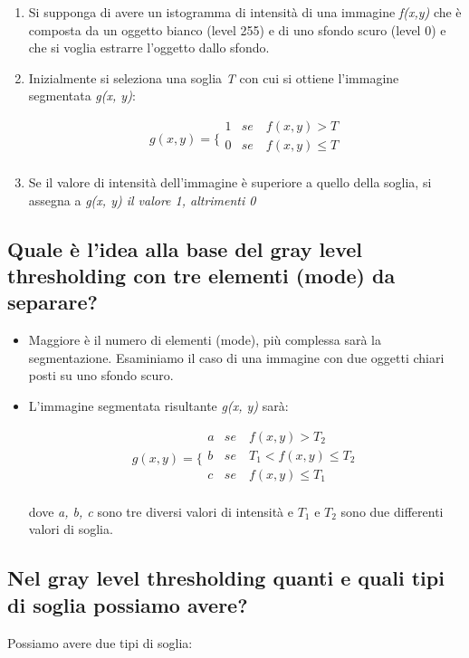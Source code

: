 \begin{enumerate}
\item Si supponga di avere un istogramma di intensità di una immagine \textit{f(x,y)} che è composta da un oggetto bianco (level 255) e di uno sfondo scuro (level 0) e che si voglia estrarre l'oggetto dallo sfondo.

\item Inizialmente si seleziona una soglia \textit{T} con cui si ottiene l'immagine segmentata \textit{g(x, y)}:

$$
g(x, y) =
\bigg \{
\begin{array}{rl}
1 & se \quad f(x, y) > T \\
0 & se \quad f(x, y) \leq T \\
\end{array}
$$

\item Se il valore di intensità dell'immagine è superiore a quello della soglia, si assegna a \textit{g(x, y) il valore 1, altrimenti 0}
\end{enumerate}

\subsection{Quale è l'idea alla base del gray level thresholding con tre elementi (mode) da separare?}

\begin{itemize}
\item Maggiore è il numero di elementi (mode), più complessa sarà la segmentazione. Esaminiamo il caso di una immagine con due oggetti chiari posti su uno sfondo scuro.

\item L'immagine segmentata risultante \textit{g(x, y)} sarà:

$$
g(x, y) =
\bigg \{
\begin{array}{rl}
a & se \quad f(x, y) > T_2 \\
b & se \quad  T_1 < f(x, y) \leq T_2 \\
c & se \quad f(x, y) \leq T_1 \\
\end{array}
$$

dove \textit{a, b, c} sono tre diversi valori di intensità e $T_1$ e $T_2$ sono due differenti valori di soglia.

\end{itemize}


\subsection{Nel gray level thresholding quanti e quali tipi di soglia possiamo avere?}
Possiamo avere due tipi di soglia:


